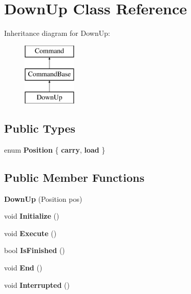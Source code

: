 \hypertarget{class_down_up}{}\section{Down\+Up Class Reference}
\label{class_down_up}
Inheritance diagram for Down\+Up\+:\begin{figure}[H]
\begin{center}
\leavevmode
\includegraphics[height=3.000000cm]{class_down_up}
\end{center}
\end{figure}
\subsection*{Public Types}
\begin{DoxyCompactItemize}
\item 
\hypertarget{class_down_up_a97cdf7f274b23a3856fa1f9714fb64a3}{}enum {\bfseries Position} \{ {\bfseries carry}, 
{\bfseries load}
 \}\label{class_down_up_a97cdf7f274b23a3856fa1f9714fb64a3}

\end{DoxyCompactItemize}
\subsection*{Public Member Functions}
\begin{DoxyCompactItemize}
\item 
\hypertarget{class_down_up_a7b54bea97efdec2d132e5c9dc51141fa}{}{\bfseries Down\+Up} (Position pos)\label{class_down_up_a7b54bea97efdec2d132e5c9dc51141fa}

\item 
\hypertarget{class_down_up_ab88d3595bc2e6929505d4d6d292c0f5a}{}void {\bfseries Initialize} ()\label{class_down_up_ab88d3595bc2e6929505d4d6d292c0f5a}

\item 
\hypertarget{class_down_up_ae7908a4df790edf172f0a413793e2dcf}{}void {\bfseries Execute} ()\label{class_down_up_ae7908a4df790edf172f0a413793e2dcf}

\item 
\hypertarget{class_down_up_af1f8ba9675e6238f8ddaa73d29867b05}{}bool {\bfseries Is\+Finished} ()\label{class_down_up_af1f8ba9675e6238f8ddaa73d29867b05}

\item 
\hypertarget{class_down_up_a715d8a538612d3d9291597043e5b7369}{}void {\bfseries End} ()\label{class_down_up_a715d8a538612d3d9291597043e5b7369}

\item 
\hypertarget{class_down_up_a6de6bbf1a16169fed03f6f1566c6c2a4}{}void {\bfseries Interrupted} ()\label{class_down_up_a6de6bbf1a16169fed03f6f1566c6c2a4}

\end{DoxyCompactItemize}
